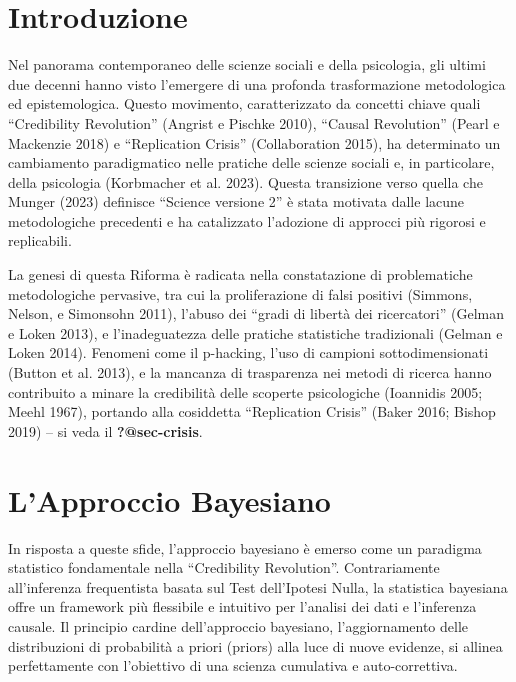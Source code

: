 \documentclass[
  letterpaper,
  krantz2]{{[}./krantz{]}}
\begin{document}
\section*{Introduzione}\label{introduzione-6}


Nel panorama contemporaneo delle scienze sociali e della psicologia, gli
ultimi due decenni hanno visto l'emergere di una profonda trasformazione
metodologica ed epistemologica. Questo movimento, caratterizzato da
concetti chiave quali ``Credibility Revolution'' (Angrist e Pischke
2010), ``Causal Revolution'' (Pearl e Mackenzie 2018) e ``Replication
Crisis'' (Collaboration 2015), ha determinato un cambiamento
paradigmatico nelle pratiche delle scienze sociali e, in particolare,
della psicologia (Korbmacher et al. 2023). Questa transizione verso
quella che Munger (2023) definisce ``Science versione 2'' è stata
motivata dalle lacune metodologiche precedenti e ha catalizzato
l'adozione di approcci più rigorosi e replicabili.

La genesi di questa Riforma è radicata nella constatazione di
problematiche metodologiche pervasive, tra cui la proliferazione di
falsi positivi (Simmons, Nelson, e Simonsohn 2011), l'abuso dei ``gradi
di libertà dei ricercatori'' (Gelman e Loken 2013), e l'inadeguatezza
delle pratiche statistiche tradizionali (Gelman e Loken 2014). Fenomeni
come il p-hacking, l'uso di campioni sottodimensionati (Button et al.
2013), e la mancanza di trasparenza nei metodi di ricerca hanno
contribuito a minare la credibilità delle scoperte psicologiche
(Ioannidis 2005; Meehl 1967), portando alla cosiddetta ``Replication
Crisis'' (Baker 2016; Bishop 2019) -- si veda il \textbf{?@sec-crisis}.

\section{L'Approccio Bayesiano}\label{lapproccio-bayesiano}

In risposta a queste sfide, l'approccio bayesiano è emerso come un
paradigma statistico fondamentale nella ``Credibility Revolution''.
Contrariamente all'inferenza frequentista basata sul Test dell'Ipotesi
Nulla, la statistica bayesiana offre un framework più flessibile e
intuitivo per l'analisi dei dati e l'inferenza causale. Il principio
cardine dell'approccio bayesiano, l'aggiornamento delle distribuzioni di
probabilità a priori (priors) alla luce di nuove evidenze, si allinea
perfettamente con l'obiettivo di una scienza cumulativa e
auto-correttiva.
\end{document}
